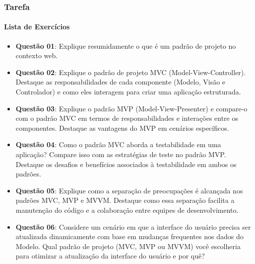 \documentclass[
	9pt, %
	t, %
]{beamer}
\begin{document}
\begin{frame}
	\frametitle{Tarefa}
	\framesubtitle{Lista de Exercícios}

	\begin{itemize}
		\item { \small \textbf{Questão 01}: Explique resumidamente o que é um padrão de projeto no contexto web. }
		\item { \small \textbf{Questão 02}: Explique o padrão de projeto MVC (Model-View-Controller). Destaque as responsabilidades de cada componente (Modelo, Visão e Controlador) e como eles interagem para criar uma aplicação estruturada. }
		\item { \small \textbf{Questão 03}: Explique o padrão MVP (Model-View-Presenter) e compare-o com o padrão MVC em termos de responsabilidades e interações entre os componentes. Destaque as vantagens do MVP em cenários específicos. }
		\item { \small \textbf{Questão 04}: Como o padrão MVC aborda a testabilidade em uma aplicação? Compare isso com as estratégias de teste no padrão MVP. Destaque os desafios e benefícios associados à testabilidade em ambos os padrões. }
		\item { \small \textbf{Questão 05}: Explique como a separação de preocupações é alcançada nos padrões MVC, MVP e MVVM. Destaque como essa separação facilita a manutenção do código e a colaboração entre equipes de desenvolvimento. }
		\item { \small \textbf{Questão 06}: Considere um cenário em que a interface do usuário precisa ser atualizada dinamicamente com base em mudanças frequentes nos dados do Modelo. Qual padrão de projeto (MVC, MVP ou MVVM) você escolheria para otimizar a atualização da interface do usuário e por quê? }
	\end{itemize}

\end{frame}





\end{document}

